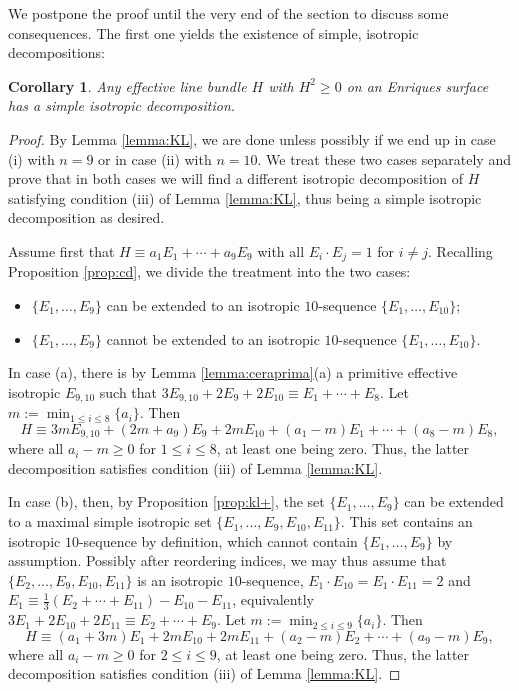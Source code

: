 \documentclass[11pt]{amsart}
\newtheorem{corollary}[thm]{Corollary}
\theoremstyle{definition}
\def\min{\operatorname{min}}
\renewcommand{\leq}{\leqslant}
\renewcommand{\geq}{\geqslant}
\begin{document}
 We postpone the proof until the very end of the section to 
 discuss some consequences.  The first one yields the existence of simple, isotropic decompositions:


\begin{corollary}  \label{cor:kl++}
  Any effective line bundle $H$
with $H^ 2\geqslant 0$ on an Enriques surface has a simple isotropic decomposition.
\end{corollary}
 
\begin{proof}
 By Lemma \ref{lemma:KL}, we are done unless possibly if we end up in
case (i) with $n=9$ or 
in case (ii) with $n=10$. We treat these two cases separately and prove that in both cases we will find a different isotropic decomposition of $H$ satisfying condition (iii) of Lemma \ref{lemma:KL}, thus being a simple isotropic decomposition as desired. 

Assume first that $H \equiv a_1E_1+\cdots+a_{9}E_{9}$ with all $E_i \cdot E_j=1$ for $i \neq j$. Recalling Proposition \ref{prop:cd}, we divide the treatment into the two cases:
\begin{itemize}
\item[(a)] $\{E_1,\ldots,E_9\}$ can be extended to an isotropic $10$-sequence $\{E_1,\ldots,E_{10}\}$;
\item[(b)] $\{E_1,\ldots,E_9\}$ cannot be extended to an isotropic $10$-sequence $\{E_1,\ldots,E_{10}\}$.
\end{itemize}

In case (a), there is by Lemma \ref{lemma:ceraprima}(a) a primitive effective
isotropic $E_{9,10}$ such that 
$3E_{9,10}+2E_{9}+2E_{10} \equiv E_1+\cdots+E_8$.
Let $m:=\min_{1 \leq i \leq 8}\{a_i\}$. Then 
\[ H \equiv 3mE_{9,10}+(2m+a_9)E_{9}+2mE_{10} + (a_1-m)E_1+\cdots+(a_{8}-m)E_{8},\] where all $a_i-m \geq 0$ for $1 \leq i \leq 8$, at  least one being zero. Thus, the latter decomposition satisfies condition (iii) of Lemma \ref{lemma:KL}.

In case (b), then, by Proposition \ref{prop:kl+}, the set $\{E_1,\ldots,E_9\}$ can be extended to a maximal simple isotropic set $\{E_1,\ldots,E_9,E_{10},E_{11}\}$. 
This set contains an isotropic $10$-sequence by definition, which cannot contain
$\{E_1,\ldots,E_9\}$ by assumption. Possibly after reordering indices, we may thus assume that $\{E_2,\ldots,E_9,E_{10},E_{11}\}$ is an isotropic $10$-sequence, $E_1 \cdot E_{10}=E_1 \cdot E_{11}=2$ and $E_1 \equiv \frac{1}{3}(E_2+\cdots+E_{11})-E_{10}-E_{11}$, equivalently $3E_1+2E_{10}+2E_{11} \equiv E_2+\cdots+E_9$.
Let $m:=\min_{2 \leq i \leq 9}\{a_i\}$. Then 
\[ H \equiv (a_1+3m)E_1+2mE_{10}+2mE_{11} + (a_2-m)E_2+\cdots+(a_{9}-m)E_{9},\] where all $a_i-m \geq 0$ for $2 \leq i \leq 9$, at  least one being zero. Thus, the latter decomposition satisfies condition (iii) of Lemma \ref{lemma:KL}.


\end{proof}
\end{document}

